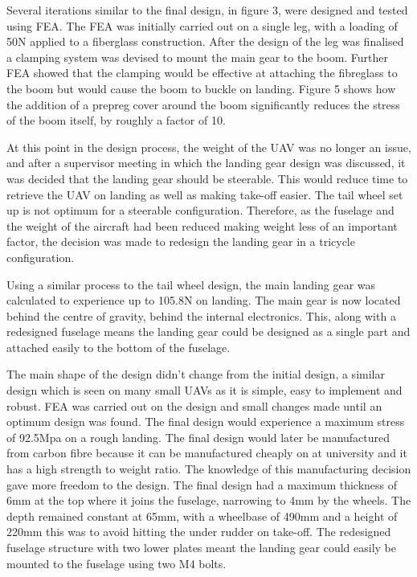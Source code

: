 \documentclass[../../main.tex]{subfiles}
\begin{document}
Several iterations similar to the final design, in figure 3, were designed and tested using FEA.
The FEA was initially carried out on a single leg, with a loading of 50N applied to a fiberglass construction.
After the design of the leg was finalised a clamping system was devised to mount the main gear to the boom.
Further FEA showed that the clamping would be effective at attaching the fibreglass to the boom but would cause the boom to buckle on landing.
Figure 5 shows how the addition of a prepreg cover around the boom significantly reduces the stress of the boom itself, by roughly a factor of 10. 


At this point in the design process, the weight of the UAV was no longer an issue, and after a supervisor meeting in which the landing gear design was discussed, it was decided that the landing gear should be steerable.
This would reduce time to retrieve the UAV on landing as well as making take-off easier.
The tail wheel set up is not optimum for a steerable configuration.
Therefore, as the fuselage and the weight of the aircraft had been reduced making weight less of an important factor, the decision was made to redesign the landing gear in a tricycle configuration. 

Using a similar process to the tail wheel design, the main landing gear was calculated to experience up to 105.8N on landing.
The main gear is now located behind the centre of gravity, behind the internal electronics.
This, along with a redesigned fuselage means the landing gear could be designed as a single part and attached easily to the bottom of the fuselage. 


The main shape of the design didn’t change from the initial design, a similar design which is seen on many small UAVs as it is simple, easy to implement and robust.
FEA was carried out on the design and small changes made until an optimum design was found.
The final design would experience a maximum stress of 92.5Mpa on a rough landing.
The final design would later be manufactured from carbon fibre because it can be manufactured cheaply on at university and it has a high strength to weight ratio.
The knowledge of this manufacturing decision gave more freedom to the design.
The final design had a maximum thickness of 6mm at the top where it joins the fuselage, narrowing to 4mm by the wheels.
The depth remained constant at 65mm, with a wheelbase of 490mm and a height of 220mm this was to avoid hitting the under rudder on take-off.
The redesigned fuselage structure with two lower plates meant the landing gear could easily be mounted to the fuselage using two M4 bolts. 
\end{document}

